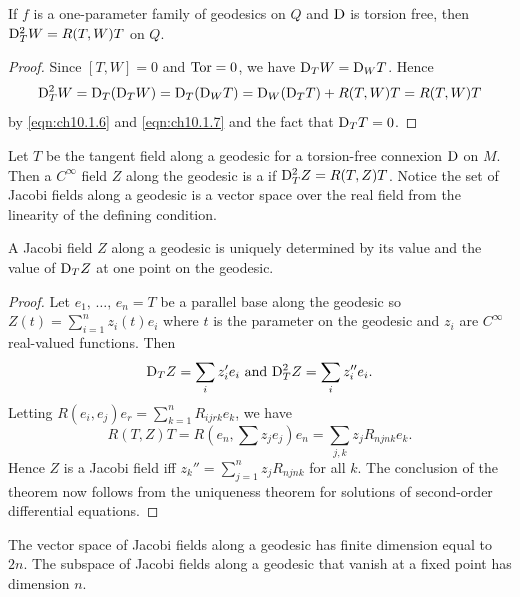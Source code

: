 \documentclass[../main]{subfiles}
\begin{document}
\begin{theorem} \label{thm:ch10.1.4}
If $f$ is a one-parameter family of geodesics on $Q$ and $\mathrm{D}$ is torsion free, then $\mathrm{D}_T^2 W = R(T,W)T$ on $Q$.
\end{theorem}

\begin{proof}
Since $[T,W]=0$ and $\mathrm{Tor}=0$, we have $\mathrm{D}_T W = \mathrm{D}_W T$. Hence
\[
\mathrm{D}_T^2 W 
= 
\mathrm{D}_T(\mathrm{D}_T W)
=
\mathrm{D}_T(\mathrm{D}_W T)
=
\mathrm{D}_W(\mathrm{D}_T T) + R(T,W)T
=
R(T,W)T
\]
by \eqref{eqn:ch10.1.6} and \eqref{eqn:ch10.1.7} and the fact that $\mathrm{D}_T T = 0$.
\end{proof}



Let $T$ be the tangent field along a geodesic for a torsion-free connexion $\mathrm{D}$ on $M$. Then a $C^\infty$ field $Z$ along the geodesic is a  if $\mathrm{D}_T^2 Z = R(T,Z)T$. Notice the set of Jacobi fields along a geodesic is a vector space over the real field from the linearity of the defining condition.



\begin{theorem} \label{thm:ch10.1.5}
A Jacobi field $Z$ along a geodesic is uniquely determined by its value and the value of $\mathrm{D}_T Z$ at one point on the geodesic.
\end{theorem}

\begin{proof}
Let $e_1,\, \hdots,\, e_n = T$ be a parallel base along the geodesic so \newline$Z(t)=\displaystyle \sum_{i=1}^n z_i(t) e_i$ where $t$ is the parameter on the geodesic and $z_i$ are $C^\infty$ real-valued functions. Then \[\mathrm{D}_T Z = \sum_i z_i' e_i\text{ and }\mathrm{D}_T^2 Z = \sum_i z_i'' e_i.\] Letting $R(e_i,e_j)e_r=\displaystyle\sum_{k=1}^n R_{ijrk}e_k$, we have \[R(T,Z)T=R(e_n,\sum z_je_j)e_n=\sum_{j,k}z_j R_{njnk} e_k.\] Hence $Z$ is a Jacobi field iff $z_k''=\displaystyle\sum_{j=1}^n z_j R_{njnk}$ for all $k$. The conclusion of the theorem now follows from the uniqueness theorem for solutions of second-order differential equations.
\end{proof}



\begin{corollary} \label{cor:ch10.1.6}
The vector space of Jacobi fields along a geodesic has finite dimension equal to $2n$. The subspace of Jacobi fields along a geodesic that vanish at a fixed point has dimension $n$.
\end{corollary}
\end{document}
